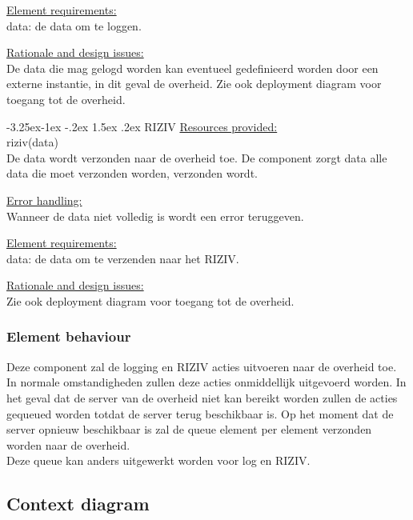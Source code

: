 \documentclass[a4paper,10pt]{book}
\makeatletter
\renewcommand\paragraph{\@startsection{paragraph}{4}{\z@}%
  {-3.25ex\@plus -1ex \@minus -.2ex}%
  {1.5ex \@plus .2ex}%
  {\normalfont\normalsize\bfseries}}
\makeatother
\begin{document}
\underline{Element requirements:}\\
data: de data om te loggen.

\underline{Rationale and design issues:}\\
De data die mag gelogd worden kan eventueel gedefinieerd worden door een externe instantie, in dit geval de overheid.
Zie ook deployment diagram voor toegang tot de overheid.

\paragraph{RIZIV}
\underline{Resources provided:}\\
riziv(data)\\
De data wordt verzonden naar de overheid toe.  De component zorgt data alle data die moet verzonden worden, verzonden wordt.

\underline{Error handling:}\\
Wanneer de data niet volledig is wordt een error teruggeven.

\underline{Element requirements:}\\
data: de data om te verzenden naar het RIZIV.

\underline{Rationale and design issues:}\\
Zie ook deployment diagram voor toegang tot de overheid.

\subsubsection{Element behaviour}
Deze component zal de logging en RIZIV acties uitvoeren naar de overheid toe.  In normale omstandigheden zullen deze acties onmiddellijk uitgevoerd worden.  In het geval dat de server van de overheid niet kan bereikt worden zullen de acties gequeued worden totdat de server terug beschikbaar is.  Op het moment dat de server opnieuw beschikbaar is zal de queue element per element verzonden worden naar de overheid.\\
Deze queue kan anders uitgewerkt worden voor log en RIZIV.

\subsection{Context diagram}
\end{document}
